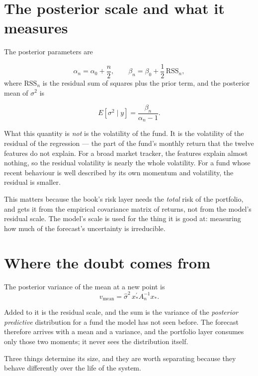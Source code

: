 \section{The posterior scale and what it measures}

The posterior parameters are

\begin{equation}
\alpha_n = \alpha_0 + \frac{n}{2},
\qquad
\beta_n = \beta_0 + \frac{1}{2}\,\mathrm{RSS}_n,
\end{equation}
where \(\mathrm{RSS}_n\) is the residual sum of squares plus the prior
term, and the posterior mean of \(\sigma^2\) is

\begin{equation}
E[\sigma^2 \mid y] = \frac{\beta_n}{\alpha_n - 1}.
\end{equation}

What this quantity is \emph{not} is the volatility of the fund. It is the
volatility of the residual of the regression --- the part of the fund's
monthly return that the twelve features do not explain. For a broad
market tracker, the features explain almost nothing, so the residual
volatility is nearly the whole volatility. For a fund whose recent
behaviour is well described by its own momentum and volatility, the
residual is smaller.

This matters because the book's risk layer needs the \emph{total} risk of
the portfolio, and gets it from the empirical covariance matrix of
returns, not from the model's residual scale. The model's scale is used
for the thing it is good at: measuring how much of the forecast's
uncertainty is irreducible.

\section{Where the doubt comes from}

The posterior variance of the mean at a new point is
\begin{equation}
v_{\mathrm{mean}} = \hat{\sigma}^2\, x_*^{\prime}A_n^{-1}x_*.
\end{equation}

Added to it is the residual scale, and the sum is the variance of the
\emph{posterior predictive} distribution for a fund the model has not seen
before. The forecast therefore arrives with a mean and a variance, and the
portfolio layer consumes only those two moments; it never sees the
distribution itself.

Three things determine its size, and they are worth separating because
they behave differently over the life of the system.

